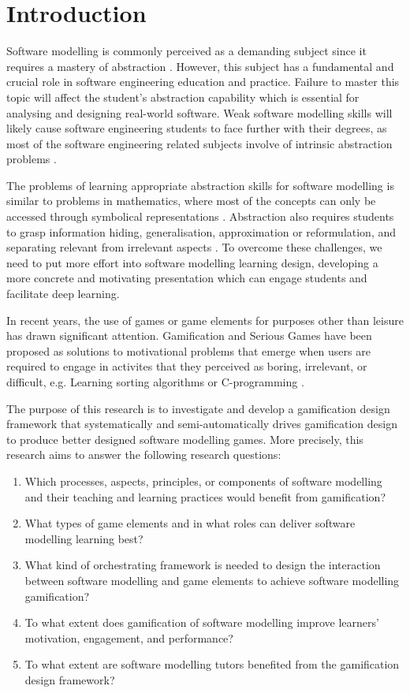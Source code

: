 \documentclass[runningheads,a4paper]{llncs}
\begin{document}
\section{Introduction}
Software modelling is commonly perceived as a demanding subject since it requires a mastery of abstraction \cite{Borstler2012}. However, this subject has a fundamental and crucial role in software engineering education and practice. Failure to master this topic will affect the student’s abstraction capability which is essential for analysing and designing real-world software. Weak software modelling skills will likely cause software engineering students to face further with their degrees, as most of the software engineering related subjects involve of intrinsic abstraction problems \cite{Kramer2007}. 

The problems of learning appropriate abstraction skills for software modelling is similar to problems in mathematics, where most of the concepts can only be accessed through symbolical representations \cite{Duval2006}. Abstraction also requires students to grasp information hiding, generalisation, approximation or reformulation, and separating relevant from irrelevant aspects \cite{Saitta2013}. To overcome these challenges, we need to put more effort into software modelling learning design, developing a more concrete and motivating presentation which can engage students and facilitate deep learning.

In recent years, the use of games or game elements for purposes other than leisure has drawn significant attention. Gamification \cite{deterding2011game} and Serious Games \cite{Michael2005} have been proposed as solutions to motivational problems that emerge when users are required to engage in activites that they perceived as boring, irrelevant, or difficult, e.g. Learning sorting algorithms \cite{Yohannis2015} or C-programming \cite{Ibanez2014}.

The purpose of this research is to investigate and develop a gamification design framework that systematically and semi-automatically drives gamification design to produce better designed software modelling games. More precisely, this research aims to answer the following research questions:
\begin{enumerate}
\item Which processes, aspects, principles, or components of software modelling and their teaching and learning practices would benefit from gamification?
\item What types of game elements and in what roles can deliver software modelling learning best? 
\item What kind of orchestrating framework is needed to design the interaction between software modelling and game elements to achieve software modelling gamification?
\item To what extent does gamification of software modelling improve learners’ motivation, engagement, and performance?
\item To what extent are software modelling tutors benefited from the gamification design framework?
\end{enumerate}
\end{document}
